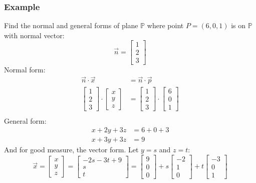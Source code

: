 \documentclass[letterpaper, 12pt]{math}
\begin{document}
\subsubsection*{Example}
Find the normal and general forms of plane \( \mathbb{P} \) where point
\( P = (6,0,1) \) is on \( \mathbb{P} \) with normal vector:
\[ \vec{n} = \begin{bmatrix}1 \\ 2 \\ 3\end{bmatrix} \]
Normal form:
\begin{align*}
  \vec{n}\cdot\vec{x} &= \vec{n}\cdot\vec{p} \\
  \begin{bmatrix}1 \\ 2 \\ 3\end{bmatrix}\cdot
    \begin{bmatrix}x \\ y \\ z\end{bmatrix} &=
    \begin{bmatrix}1 \\ 2 \\ 3\end{bmatrix}\cdot
    \begin{bmatrix}6 \\ 0 \\ 1\end{bmatrix} \\
\end{align*}
General form:
\begin{align*}
  x+2y+3z &= 6+0+3 \\
  x+3y+3z &= 9
\end{align*}
And for good measure, the vector form. Let \( y = s \) and \( z = t \):
\[ \vec{x} = \begin{bmatrix}x \\ y \\ z\end{bmatrix} =
  \begin{bmatrix}-2s-3t+9 \\ s \\ t\end{bmatrix} =
  \begin{bmatrix}9 \\ 0 \\ 0\end{bmatrix}+
  s\begin{bmatrix}-2 \\ 1 \\ 0\end{bmatrix}+
  t\begin{bmatrix}-3 \\ 0 \\ 1\end{bmatrix} \]
\end{document}
